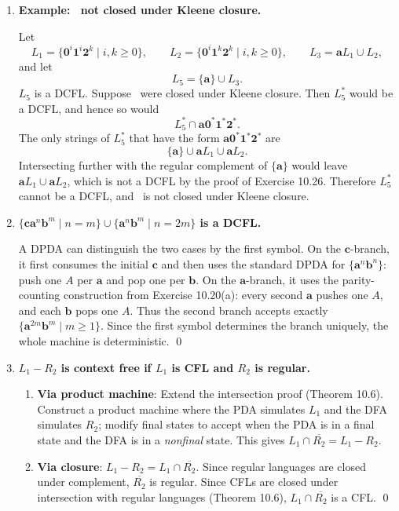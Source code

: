 \begin{enumerate}[{10.}1. ]
\item \textbf{Example: \ASIG\ not closed under Kleene closure.}

Let
\[
L_1=\{\pmb{0}^i\pmb{1}^i\pmb{2}^k\mid i,k\geq 0\},
\qquad
L_2=\{\pmb{0}^i\pmb{1}^k\pmb{2}^k\mid i,k\geq 0\},
\qquad
L_3=\pmb{a}L_1\cup L_2,
\]
and let
\[
L_5=\{\pmb{a}\}\cup L_3.
\]
$L_5$ is a DCFL. Suppose \ASIG\ were closed under Kleene closure. Then $L_5^*$ would be a DCFL, and hence so would
\[
L_5^*\cap \pmb{a}\pmb{0}^*\pmb{1}^*\pmb{2}^*.
\]
The only strings of $L_5^*$ that have the form $\pmb{a}\pmb{0}^*\pmb{1}^*\pmb{2}^*$ are
\[
\{\pmb{a}\}\cup \pmb{a}L_1\cup \pmb{a}L_2.
\]
Intersecting further with the regular complement of $\{\pmb{a}\}$ would leave $\pmb{a}L_1\cup \pmb{a}L_2$, which is not a DCFL by the proof of Exercise 10.26. Therefore $L_5^*$ cannot be a DCFL, and \ASIG\ is not closed under Kleene closure.

\item \textbf{$\{\pmb{ca}^n\pmb{b}^m \mid n=m\}\cup\{\pmb{a}^n\pmb{b}^m \mid n=2m\}$ is a DCFL.}

A DPDA can distinguish the two cases by the first symbol. On the $\pmb{c}$-branch, it first consumes the initial $\pmb{c}$ and then uses the standard DPDA for $\{\pmb{a}^n\pmb{b}^n\}$: push one $A$ per $\pmb{a}$ and pop one per $\pmb{b}$. On the $\pmb{a}$-branch, it uses the parity-counting construction from Exercise 10.20(a): every second $\pmb{a}$ pushes one $A$, and each $\pmb{b}$ pops one $A$. Thus the second branch accepts exactly $\{\pmb{a}^{2m}\pmb{b}^m\mid m\geq 1\}$. Since the first symbol determines the branch uniquely, the whole machine is deterministic. \qed

\item \textbf{$L_1 - R_2$ is context free if $L_1$ is CFL and $R_2$ is regular.}

\begin{enumerate}
\item \textbf{Via product machine}: Extend the intersection proof (Theorem 10.6). Construct a product machine where the PDA simulates $L_1$ and the DFA simulates $R_2$; modify final states to accept when the PDA is in a final state and the DFA is in a \emph{nonfinal} state. This gives $L_1 \cap \overline{R_2} = L_1 - R_2$.

\item \textbf{Via closure}: $L_1 - R_2 = L_1 \cap \overline{R_2}$. Since regular languages are closed under complement, $\overline{R_2}$ is regular. Since CFLs are closed under intersection with regular languages (Theorem 10.6), $L_1 \cap \overline{R_2}$ is a CFL. \qed
\end{enumerate}


\end{enumerate}
